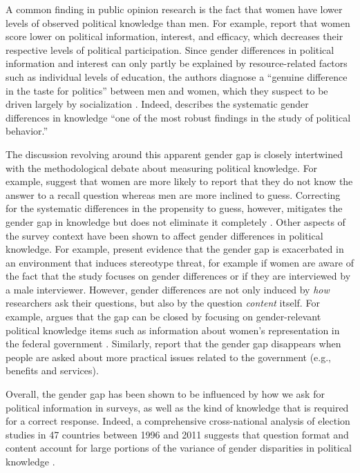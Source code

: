 A common finding in public opinion research is the fact that women have lower levels of observed political knowledge than men. For example, \citet{verba1997knowing} report that women score lower on political information, interest, and efficacy, which decreases their respective levels of political participation. Since gender differences in political information and interest can only partly be explained by resource-related factors such as individual levels of education, the authors diagnose a ``genuine difference in the taste for politics'' between men and women, which they suspect to be driven largely by socialization \citep[see also][]{wolak2011roots}. Indeed, \citet[117]{dow2009gender} describes the systematic gender differences in knowledge ``one of the most robust findings in the study of political behavior.''

The discussion revolving around this apparent gender gap is closely intertwined with the methodological debate about measuring political knowledge. For example, \citet{mondak2004knowledge} suggest that women are more likely to report that they do not know the answer to a recall question whereas men are more inclined to guess. Correcting for the systematic differences in the propensity to guess, however, mitigates the gender gap in knowledge but does not eliminate it completely \citep[see also][]{lizotte2009explaining}. Other aspects of the survey context have been shown to affect gender differences in political knowledge. For example, \citet{mcglone2006stereotype} present evidence that the gender gap is exacerbated in an environment that induces stereotype threat, for example if women are aware of the fact that the study focuses on gender differences or if they are interviewed by a male interviewer. However, gender differences are not only induced by \textit{how} researchers ask their questions, but also by the question \textit{content} itself. For example, \citet{dolan2011women} argues that the gap can be closed by focusing on gender-relevant political knowledge items such as information about women's representation in the federal government \citep[see also][]{graber2001processing,fraile2014does,jerit2017revisiting}. Similarly, \citet{stolle2010women} report that the gender gap disappears when people are asked about more practical issues related to the government (e.g., benefits and services).

Overall, the gender gap has been shown to be influenced by how we ask for political information in surveys, as well as the kind of knowledge that is required for a correct response. Indeed, a comprehensive cross-national analysis of election studies in 47 countries between 1996 and 2011 suggests that question format and content account for large portions of the variance of gender disparities in political knowledge \citep{fortin2016cross}.


